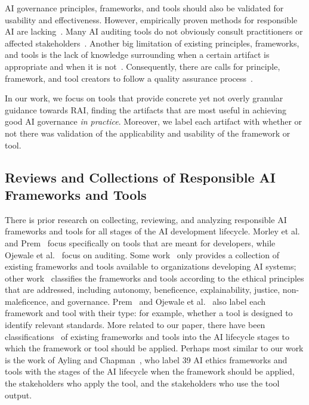 AI governance principles, frameworks, and tools should also be validated for usability and effectiveness.
However, empirically proven methods for responsible AI are lacking~\cite{mittelstadt2019ai}.
Many AI auditing tools do not obviously consult practitioners or affected stakeholders~\cite{Ojewale2024}.
Another big limitation of existing principles, frameworks, and tools is the lack of knowledge surrounding when a certain artifact is appropriate and when it is not~\cite{Kaye2023}.
Consequently, there are calls for principle, framework, and tool creators to follow a quality assurance process~\cite{Kaye2023}.

In our work, we focus on tools that provide concrete yet not overly granular guidance towards RAI, finding the artifacts that are most useful in achieving good AI governance \emph{in practice}. 
Moreover, we label each artifact with whether or not there was validation of the applicability and usability of the framework or tool.

\subsection{Reviews and Collections of Responsible AI Frameworks and Tools}

There is prior research on collecting, reviewing, and analyzing responsible AI frameworks and tools for all stages of the AI development lifecycle.
Morley et al.~\cite{Morley2019} and Prem~\cite{Prem2023} focus specifically on tools that are meant for developers, 
while Ojewale et al.~\cite{Ojewale2024} focus on auditing.
Some work~\cite{Johnson2023} only provides a collection of existing frameworks and tools available to organizations developing AI systems;
other work~\cite{Ortega2024, Morley2019, Prem2023} classifies the frameworks and tools according to the ethical principles that are addressed, including autonomy, beneficence, explainability, justice, non-maleficence, and governance.
Prem~\cite{Prem2023} and Ojewale et al.~\cite{Ojewale2024} also label each framework and tool with their type: for example, whether a tool is designed to identify relevant standards.
More related to our paper, there have been classifications~\cite{Ayling2022, Ortega2024, Morley2019, Prem2023} of existing frameworks and tools into the AI lifecycle stages to which the framework or tool should be applied.
Perhaps most similar to our work is the work of Ayling and Chapman~\cite{Ayling2022}, who label 39 AI ethics frameworks and tools with the stages of the AI lifecycle when the framework should be applied, the stakeholders who apply the tool, and the stakeholders who use the tool output.

